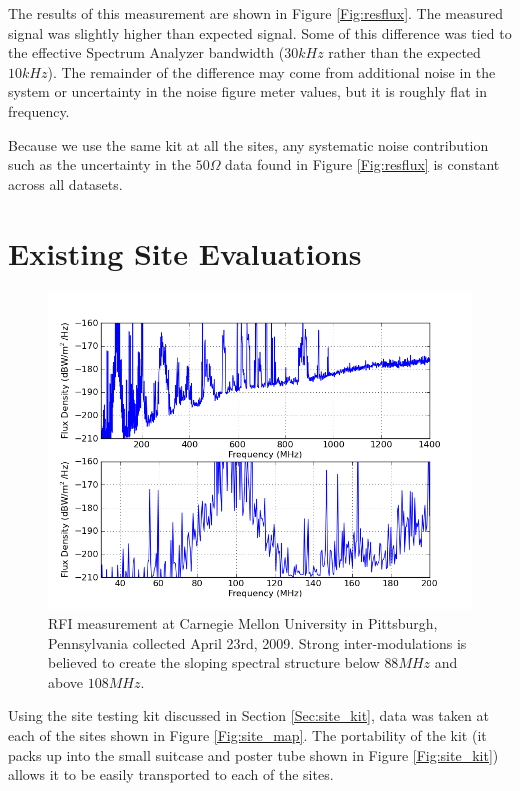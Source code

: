 The results of this measurement are shown in Figure \ref{Fig:resflux}. The measured signal was slightly higher than expected signal. Some of this difference was tied to the effective Spectrum Analyzer bandwidth ($30 kHz$ rather than the expected $10 kHz$). The remainder of the difference may come from additional noise in the system or uncertainty in the noise figure meter values, but it is roughly flat in frequency. 

Because we use the same kit at all the sites, any systematic noise contribution such as the uncertainty in the $50 \Omega$ data found in Figure \ref{Fig:resflux} is constant across all datasets. 



\section{Existing Site Evaluations}

\begin{figure}[tb]
\begin{center}
\includegraphics[width=0.9\linewidth]{RFI_testing/figures/Pittsburgh_cal.png}
\caption{RFI measurement at Carnegie Mellon University in Pittsburgh, Pennsylvania collected April 23rd, 2009. Strong inter-modulations is believed to create the sloping spectral structure below $88 MHz$ and above $108 MHz$.}
\label{Fig:pghcal}
\end{center}
\end{figure}

Using the site testing kit discussed in Section \ref{Sec:site_kit}, data was taken at each of the sites shown in Figure \ref{Fig:site_map}. The portability of the kit (it packs up into the small suitcase and poster tube shown in Figure \ref{Fig:site_kit}) allows it to be easily transported to each of the sites. 



